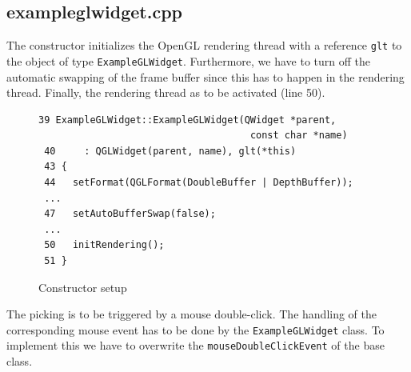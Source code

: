 \documentclass[jou,noapacite]{apa}
\begin{document}
\subsection{exampleglwidget.cpp}

The constructor initializes the OpenGL rendering thread with a
reference \lstinline|glt| to the object of type \lstinline|ExampleGLWidget|.
%
Furthermore, we have to turn off the automatic swapping of the frame buffer
since this has to happen in the rendering thread. Finally, the rendering thread
as to be activated (line 50).
%
\begin{figure}[h]
\begin{lstlisting}[basicstyle=\scriptsize]
 39 ExampleGLWidget::ExampleGLWidget(QWidget *parent,
                                     const char *name)
 40     : QGLWidget(parent, name), glt(*this)
 43 {
 44   setFormat(QGLFormat(DoubleBuffer | DepthBuffer));
 ...
 47   setAutoBufferSwap(false);
 ...
 50   initRendering();
 51 }
\end{lstlisting}
\caption{Constructor setup}
\end{figure}

The picking is to be triggered by a mouse double-click.
%
The handling of the corresponding mouse event has to be done by
the \lstinline|ExampleGLWidget| class.
%
To implement this we have to overwrite the \lstinline|mouseDoubleClickEvent| of
the base class.
\end{document}
